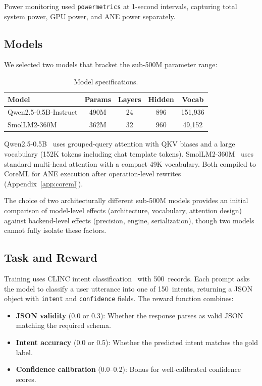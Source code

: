 \documentclass[11pt]{article}
\begin{document}
Power monitoring used \texttt{powermetrics} at 1-second intervals, capturing total system power, GPU power, and ANE power separately.

\subsection{Models}

We selected two models that bracket the sub-500M parameter range:

\begin{table}[ht]
\centering
\caption{Model specifications.}
\label{tab:models}
\begin{tabular}{lcccc}
\toprule
\textbf{Model} & \textbf{Params} & \textbf{Layers} & \textbf{Hidden} & \textbf{Vocab} \\
\midrule
Qwen2.5-0.5B-Instruct & 490M & 24 & 896 & 151,936 \\
SmolLM2-360M & 362M & 32 & 960 & 49,152 \\
\bottomrule
\end{tabular}
\end{table}

Qwen2.5-0.5B~\cite{qwen2025qwen25} uses grouped-query attention with QKV biases and a large vocabulary (152K tokens including chat template tokens).  SmolLM2-360M~\cite{allal2024smollm2} uses standard multi-head attention with a compact 49K vocabulary.  Both compiled to CoreML for ANE execution after operation-level rewrites (Appendix~\ref{app:coreml}).

The choice of two architecturally different sub-500M models provides an initial comparison of model-level effects (architecture, vocabulary, attention design) against backend-level effects (precision, engine, serialization), though two models cannot fully isolate these factors.

\subsection{Task and Reward}

Training uses CLINC intent classification~\cite{larson2019clinc150} with 500~records.  Each prompt asks the model to classify a user utterance into one of 150~intents, returning a JSON object with \texttt{intent} and \texttt{confidence} fields.  The reward function combines:

\begin{itemize}[leftmargin=*]
\item \textbf{JSON validity} (0.0 or 0.3):  Whether the response parses as valid JSON matching the required schema.
\item \textbf{Intent accuracy} (0.0 or 0.5):  Whether the predicted intent matches the gold label.
\item \textbf{Confidence calibration} (0.0--0.2):  Bonus for well-calibrated confidence scores.
\end{itemize}
\end{document}
